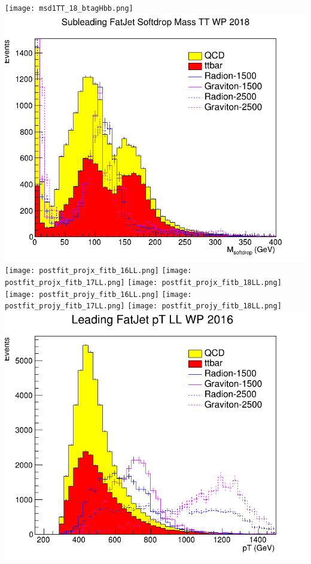 \texttt{[image: msd1TT\_18\_btagHbb.png]}
\includegraphics[width=1\textwidth]{msd1TT_18_deepTagMD_HbbvsQCD.png}
\texttt{[image: postfit\_projx\_fitb\_16LL.png]}
\texttt{[image: postfit\_projx\_fitb\_17LL.png]}
\texttt{[image: postfit\_projx\_fitb\_18LL.png]}
\texttt{[image: postfit\_projy\_fitb\_16LL.png]}
\texttt{[image: postfit\_projy\_fitb\_17LL.png]}
\texttt{[image: postfit\_projy\_fitb\_18LL.png]}
\includegraphics[width=1\textwidth]{pt0LL_16_btagHbb.png}
